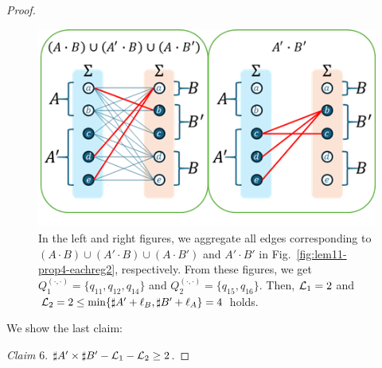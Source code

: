 \begin{proof}
\begin{figure}[t]
  \begin{center}
    \includegraphics[scale=0.8]{figs/lem11-prop4-totalreg3.png}
    \caption{In the left and right figures, we aggregate all edges corresponding to $(A\cdot B)\cup (A'\cdot B)\cup (A\cdot B')$ and $A'\cdot B'$ in Fig.~\ref{fig:lem11-prop4-eachreg2}, respectively. From these figures, we get $Q_{1}^{(\cdot,\cdot)}=\{q_{11},q_{12},q_{14}\}$ and $Q_{2}^{(\cdot,\cdot)}=\{q_{15},q_{16}\}$. Then, ${\cal L}_{1} = 2$ and ${\cal L}_{2} = 2 \leq \min\{\sharp A' + \ell_B, \sharp B' + \ell_A\} = 4$ holds.}\label{fig:lem11-prop4-totalreg2}
  \end{center}
\end{figure}


We show the last claim:
  
\smallskip

\noindent
\textit{Claim} 6. 
$\sharp A' \times \sharp B' - {\cal L}_{1} - {\cal L}_{2} \geq 2$.

\smallskip


\end{proof}
